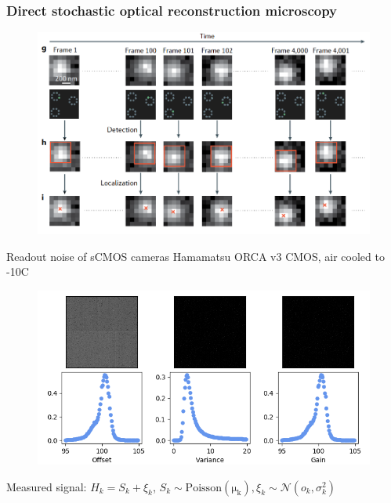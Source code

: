 \documentclass{beamer}					%
\begin{document}
\begin{frame}
\frametitle{Direct stochastic optical reconstruction microscopy}

\begin{figure}
\includegraphics[width=13cm]{Localization.png}
\end{figure}
  
\end{frame}


\begin{frame}{Readout noise of sCMOS cameras}
Hamamatsu ORCA v3 CMOS, air cooled to -10C
\begin{figure}
\includegraphics[width=12cm]{Noise-Maps.png}
\end{figure}
Measured signal: $H_{k} = S_{k} + \xi_{k}$, $S_{k}\sim \mathrm{Poisson(\mu_{k})}, \xi_{k}\sim \mathcal{N}(o_{k},\sigma_{k}^{2})$
\end{frame}
\end{document}
